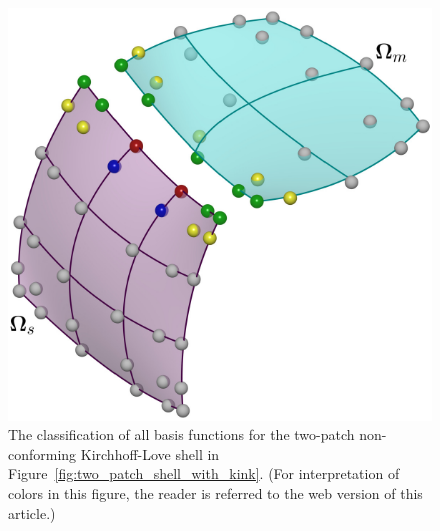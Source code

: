 \begin{figure}[ht]
	\center
	\includegraphics[width=.5\columnwidth]{control_points_classification}
	\caption{The classification of all basis functions for the two-patch non-conforming Kirchhoff-Love shell in Figure~\ref{fig:two_patch_shell_with_kink}. (For interpretation of colors in this figure, the reader is referred to the web version of this article.)}\label{fig:control_point_classification}
\end{figure}

